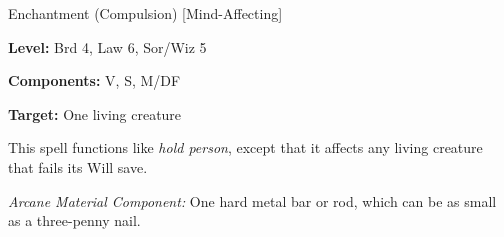 
Enchantment (Compulsion) [Mind-Affecting]

\textbf{Level:} Brd 4, Law 6, Sor/Wiz 5

\textbf{Components:} V, S, M/DF

\textbf{Target:} One living creature

This spell functions like \textit{hold person}, except that it affects any living 
creature that fails its Will save.

\textit{Arcane Material Component:} One hard metal bar or rod, which can be as 
small as a three-penny nail.

